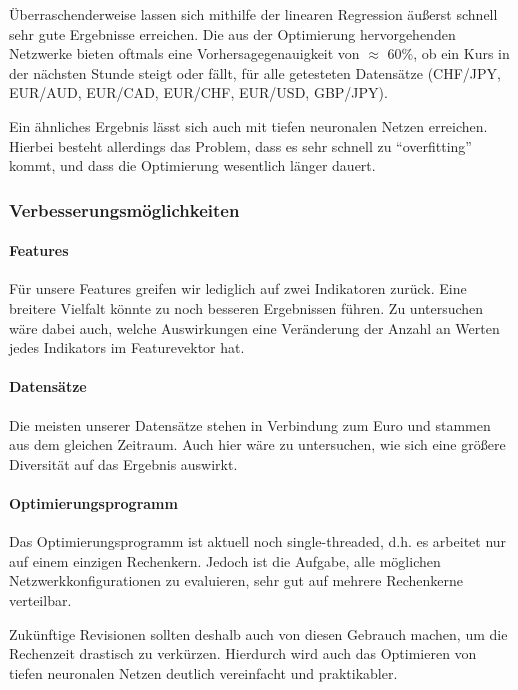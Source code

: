 Überraschenderweise lassen sich mithilfe der linearen Regression äußerst schnell sehr gute Ergebnisse erreichen. Die aus der Optimierung hervorgehenden Netzwerke bieten oftmals eine Vorhersagegenauigkeit von $\approx$ 60\%, ob ein Kurs in der nächsten Stunde steigt oder fällt, für alle getesteten Datensätze (CHF/JPY, EUR/AUD, EUR/CAD, EUR/CHF, EUR/USD, GBP/JPY).

Ein ähnliches Ergebnis lässt sich auch mit tiefen neuronalen Netzen erreichen. Hierbei besteht allerdings das Problem, dass es sehr schnell zu \enquote{overfitting} kommt, und dass die Optimierung wesentlich länger dauert.

\subsubsection{Verbesserungsmöglichkeiten}
\author{Dennis Kempf}
\label{ssec:Verbesserungsmöglichkeiten}

\paragraph{Features}
Für unsere Features greifen wir lediglich auf zwei Indikatoren zurück. Eine breitere Vielfalt könnte zu noch besseren Ergebnissen führen. Zu untersuchen wäre dabei auch, welche Auswirkungen eine Veränderung der Anzahl an Werten jedes Indikators im Featurevektor hat.

\paragraph{Datensätze}
Die meisten unserer Datensätze stehen in Verbindung zum Euro und stammen aus dem gleichen Zeitraum. Auch hier wäre zu untersuchen, wie sich eine größere Diversität auf das Ergebnis auswirkt.

\paragraph{Optimierungsprogramm}
Das Optimierungsprogramm ist aktuell noch single-threaded, d.h. es arbeitet nur auf einem einzigen Rechenkern. Jedoch ist die Aufgabe, alle möglichen Netzwerkkonfigurationen zu evaluieren, sehr gut auf mehrere Rechenkerne verteilbar. 

Zukünftige Revisionen sollten deshalb auch von diesen Gebrauch machen, um die Rechenzeit drastisch zu verkürzen. Hierdurch wird auch das Optimieren von tiefen neuronalen Netzen deutlich vereinfacht und praktikabler.

